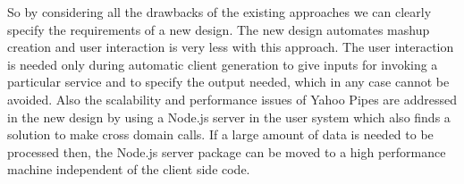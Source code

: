 \begin{spacing}{1.5}
So by considering all the drawbacks of the existing approaches we can clearly specify the requirements of a new design. The new design automates mashup creation and user interaction is very less with this approach. The user interaction is needed only during automatic client generation to give inputs for invoking a particular service and to specify the output needed, which in any case cannot be avoided. Also the scalability and performance issues of Yahoo Pipes are addressed in the new design by using a Node.js server in the user system which also finds a solution to make cross domain calls. If a large amount of data is needed to be processed then, the Node.js server package can be moved to a high performance machine independent of the client side code.
\end{spacing}
